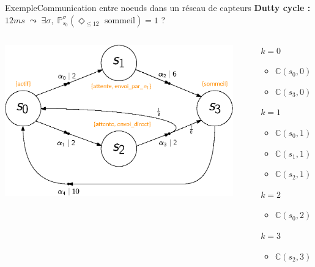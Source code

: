 \documentclass[compress]{beamer}
\begin{document}
\begin{frame}{Exemple}{Communication entre noeuds dans un réseau de capteurs}
\textbf{Dutty cycle : }$12 ms \; \leadsto \; \exists \sigma, \; \mathbb{P}^\sigma_{s_0}(\Diamond_{\leq 12} \text{ sommeil}) = 1$ ?
\begin{columns}
  \begin{column}{0.5\linewidth}
    \includegraphics[width=\linewidth]{resources/main-mdp3}
  \end{column}
  \begin{column}{0.5\linewidth}
    \scriptsize
    \begin{itemize}
      \item[$k=0$] \begin{itemize}
        \item $\mathbb{C}(s_0, 0) = \mathbb{C}(s_1, 0) = \mathbb{C}(s_2, 0) = \infty$
        \item $\mathbb{C}(s_3, 0) = 0$
      \end{itemize}
      \item[$k=1$]
        \begin{itemize}
          \item $\mathbb{C}(s_0, 1) = \infty$
          \item $\mathbb{C}(s_1, 1) = 6 + 0 = 6$
          \item $\mathbb{C}(s_2, 1) = 2 + \infty = \infty$
        \end{itemize}
      \item[$k=2$]
        \begin{itemize}
          \item $\mathbb{C}(s_0, 2) = 2 + 6 = 8$
        \end{itemize}
      \item[$k=3$]
        \begin{itemize}
          \item $\mathbb{C}(s_2, 3) = 2 + 8 = 10$
        \end{itemize}
    \end{itemize}
  \end{column}
\end{columns}
\end{frame}
\end{document}
